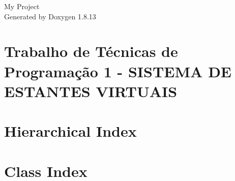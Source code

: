 \documentclass[twoside]{book}
\newcommand{\+}{\discretionary{\mbox{\scriptsize$\hookleftarrow$}}{}{}}
\newcommand{\clearemptydoublepage}{%
  \newpage{\pagestyle{empty}\cleardoublepage}%
}
\begin{document}
\hypersetup{pageanchor=false,
             bookmarksnumbered=true,
             pdfencoding=unicode
            }
\begin{titlepage}
\vspace*{7cm}
\begin{center}%
{\Large My Project }\\
\vspace*{1cm}
{\large Generated by Doxygen 1.8.13}\\
\end{center}
\end{titlepage}
\clearemptydoublepage
{}
\tableofcontents
\clearemptydoublepage
{}
\hypersetup{pageanchor=true}

\chapter{Trabalho de Técnicas de Programação 1 -\/ S\+I\+S\+T\+E\+MA DE E\+S\+T\+A\+N\+T\+ES V\+I\+R\+T\+U\+A\+IS}
\label{index}\hypertarget{index}{}
\chapter{Hierarchical Index}

\chapter{Class Index}

\end{document}
